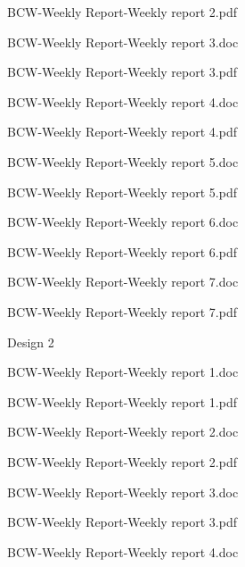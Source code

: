 \documentclass[conference]{IEEEtran}
\begin{document}
               \indent \indent \indent \indent  BCW-Weekly Report-Weekly report 2.pdf 
                
                \indent \indent \indent \indent BCW-Weekly Report-Weekly report 3.doc 
                
                \indent \indent \indent \indent BCW-Weekly Report-Weekly report 3.pdf 
                
                \indent \indent \indent \indent BCW-Weekly Report-Weekly report 4.doc 
                
               \indent \indent \indent \indent  BCW-Weekly Report-Weekly report 4.pdf 
                
                \indent \indent \indent \indent BCW-Weekly Report-Weekly report 5.doc 
                
               \indent \indent \indent \indent  BCW-Weekly Report-Weekly report 5.pdf 
                
                \indent \indent \indent \indent BCW-Weekly Report-Weekly report 6.doc 
                
                \indent \indent \indent \indent BCW-Weekly Report-Weekly report 6.pdf 
                
                \indent \indent \indent \indent BCW-Weekly Report-Weekly report 7.doc 
                
                \indent \indent \indent \indent BCW-Weekly Report-Weekly report 7.pdf 
                
            \indent \indent \indent Design 2 
            
               \indent \indent \indent \indent  BCW-Weekly Report-Weekly report 1.doc 
                
               \indent \indent \indent \indent  BCW-Weekly Report-Weekly report 1.pdf 
                
                \indent \indent \indent \indent BCW-Weekly Report-Weekly report 2.doc 
                
               \indent \indent \indent \indent  BCW-Weekly Report-Weekly report 2.pdf 
                
                \indent \indent \indent \indent BCW-Weekly Report-Weekly report 3.doc 
                
                \indent \indent \indent \indent BCW-Weekly Report-Weekly report 3.pdf 
                
                \indent \indent \indent \indent BCW-Weekly Report-Weekly report 4.doc 
                
\end{document}
